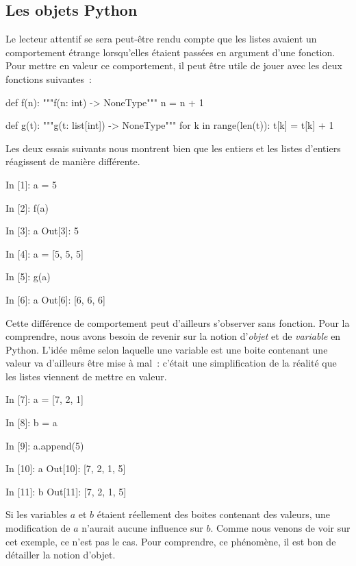 \documentclass{magnolia}
\begin{document}
\subsection{Les objets Python}

Le lecteur attentif se sera peut-être rendu compte que les listes avaient un comportement étrange lorsqu'elles
étaient passées en argument d'une fonction. Pour mettre en valeur ce comportement, il peut être utile de
jouer avec les deux fonctions suivantes~:

\begin{pythoncode}
def f(n):
    """f(n: int) -> NoneType"""
    n = n + 1

def g(t):
    """g(t: list[int]) -> NoneType"""
    for k in range(len(t)):
        t[k] = t[k] + 1
\end{pythoncode}

\noindent Les deux essais suivants nous montrent bien que les entiers et les listes d'entiers réagissent
de manière différente.
\begin{pythoncode}
In [1]: a = 5

In [2]: f(a)

In [3]: a
Out[3]: 5
\end{pythoncode}

\begin{pythoncode}
In [4]: a = [5, 5, 5]

In [5]: g(a)

In [6]: a
Out[6]: [6, 6, 6]
\end{pythoncode}

\noindent 
Cette différence de comportement peut d'ailleurs s'observer sans fonction. Pour la comprendre,
nous avons besoin de revenir sur la notion d'\emph{objet} et de \emph{variable} en Python. L'idée même selon
laquelle une variable est une boite contenant une valeur va d'ailleurs être mise à mal~: c'était une
simplification de la réalité que les listes viennent de mettre en valeur.

\begin{pythoncode}
In [7]: a = [7, 2, 1]

In [8]: b = a

In [9]: a.append(5)

In [10]: a
Out[10]: [7, 2, 1, 5]

In [11]: b
Out[11]: [7, 2, 1, 5]
\end{pythoncode}
\noindent
Si les variables $a$ et $b$ étaient réellement des boites contenant des valeurs, une modification de $a$
n'aurait aucune influence sur $b$. Comme nous venons de voir sur cet exemple, ce n'est pas le cas. Pour
comprendre, ce phénomène, il est bon de détailler la notion d'objet.\\
\end{document}
